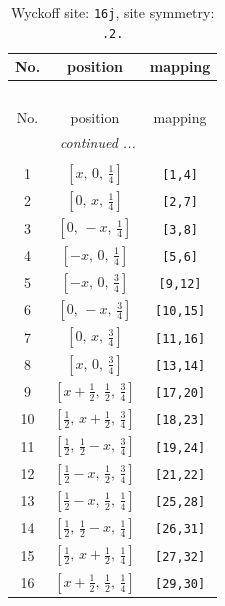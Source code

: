 \documentclass[fleqn,8pt]{jsarticle}
\begin{document}
\renewcommand{\arraystretch}{1.2}
\begin{longtable}{ccc}
\caption{Wyckoff site: {\tt 16j}, site symmetry: {\tt .2.}}
 \\
 \hline \hline
No. & position & mapping \\ \hline \endfirsthead

\multicolumn{2}{l}{\tablename\ \thetable{}} \\
 \hline \hline
No. & position & mapping \\ \hline \endhead

 \hline \hline
\multicolumn{2}{r}{\footnotesize\it continued ...} \\ \endfoot

 \hline \hline
\multicolumn{2}{r}{} \\ \endlastfoot

1 & $\left[ x,\, 0,\, \frac{1}{4} \right]$ & {\tt [1,4]} \\ \hline
2 & $\left[ 0,\, x,\, \frac{1}{4} \right]$ & {\tt [2,7]} \\ \hline
3 & $\left[ 0,\, - x,\, \frac{1}{4} \right]$ & {\tt [3,8]} \\ \hline
4 & $\left[ - x,\, 0,\, \frac{1}{4} \right]$ & {\tt [5,6]} \\ \hline
5 & $\left[ - x,\, 0,\, \frac{3}{4} \right]$ & {\tt [9,12]} \\ \hline
6 & $\left[ 0,\, - x,\, \frac{3}{4} \right]$ & {\tt [10,15]} \\ \hline
7 & $\left[ 0,\, x,\, \frac{3}{4} \right]$ & {\tt [11,16]} \\ \hline
8 & $\left[ x,\, 0,\, \frac{3}{4} \right]$ & {\tt [13,14]} \\ \hline
9 & $\left[ x + \frac{1}{2},\, \frac{1}{2},\, \frac{3}{4} \right]$ & {\tt [17,20]} \\ \hline
10 & $\left[ \frac{1}{2},\, x + \frac{1}{2},\, \frac{3}{4} \right]$ & {\tt [18,23]} \\ \hline
11 & $\left[ \frac{1}{2},\, \frac{1}{2} - x,\, \frac{3}{4} \right]$ & {\tt [19,24]} \\ \hline
12 & $\left[ \frac{1}{2} - x,\, \frac{1}{2},\, \frac{3}{4} \right]$ & {\tt [21,22]} \\ \hline
13 & $\left[ \frac{1}{2} - x,\, \frac{1}{2},\, \frac{1}{4} \right]$ & {\tt [25,28]} \\ \hline
14 & $\left[ \frac{1}{2},\, \frac{1}{2} - x,\, \frac{1}{4} \right]$ & {\tt [26,31]} \\ \hline
15 & $\left[ \frac{1}{2},\, x + \frac{1}{2},\, \frac{1}{4} \right]$ & {\tt [27,32]} \\ \hline
16 & $\left[ x + \frac{1}{2},\, \frac{1}{2},\, \frac{1}{4} \right]$ & {\tt [29,30]} \\
\end{longtable}
\end{document}

